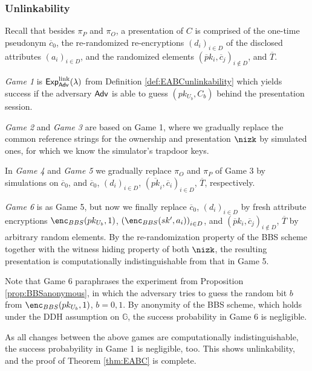 \subsubsection{Unlinkability}
Recall that besides  $\pi_P$ and $\pi_O$, a presentation of $C$ is comprised of the one-time pseudonym $\overline c_0$, the re-randomized re-encryptions $(d_i)_{i\in D}$ of the disclosed attributes $(a_i)_{i\in D}$, and the  randomized elements $(\overline pk_i, \overline c_j)_{i\notin D}$, and $\overline T$.

\begin{description}
\item
\emph{Game 1} is $\operatorname{\mathsf{Exp}_{\mathsf{Adv}}^{link}}(\lambda)$   from Definition \ref{def:EABCunlinkability} which yields success if the adversary $\mathsf{Adv}$ is able to guess $(pk_{U_b}, C_b)$ behind the presentation session.
 
 \item
\emph{Game 2} and \emph{Game 3} are based on Game 1, where we gradually replace the common reference strings for the ownership and presentation $\nizk$ by simulated ones, for which we know the simulator's trapdoor keys.

\item
In \emph{Game 4} and \emph{Game 5} we gradually replace $\pi_O$ and $\pi_P$ of Game 3 by simulations on $\overline c_0$, and $\overline c_0$, $(d_i)_{i\in D}$, $(\overline{pk}_i,\overline c_i)_{i\in D}$, $\overline T$, respectively.

 \item
\emph{Game 6} is as Game 5, but now we finally replace $\overline c_0$, $(d_i)_{i\in D}$ by fresh attribute encryptions $\enc_{BBS}(pk_{U_b},1)$, $\left(\enc_{BBS}(sk',a_i)\right)_{i\in D}$, and $(\overline pk_i, \overline c_j)_{i\notin D}$, $\overline T$ by arbitrary random elements.
By the re-randomization property of the BBS scheme together with the witness hiding property of both $\nizk$, the resulting presentation is computationally indistinguishable from that in Game 5. 
\end{description}

Note that Game 6 paraphrases the experiment from Proposition \ref{prop:BBSanonymous}, in which the adversary tries to guess the random bit $b$ from $\enc_{BBS}(pk_{U_b},1)$, $b=0,1$.
By anonymity of the BBS scheme, which holds under the DDH assumption on $\mathbb G$, the success  probability in Game 6 is negligible.

As all changes between the above games are computationally indistinguishable, the success probabyility in Game 1 is negligible, too.
This shows unlinkability, and the proof of Theorem \ref{thm:EABC} is complete.


